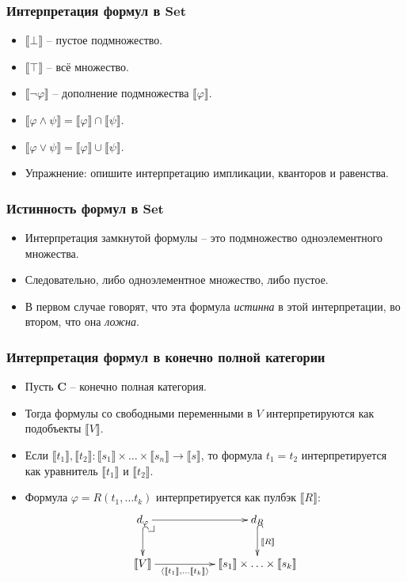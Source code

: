 \documentclass{beamer}
\makeatletter
\theoremstyle{definition}
\newcommand{\cat}[1]{\mathbf{#1}}
\renewcommand{\C}{\cat{C}}
\newcommand{\Set}{\cat{Set}}
\renewcommand{\ll}{\llbracket}
\newcommand{\rr}{\rrbracket}
\newcommand{\pb}[1][dr]{\save*!/#1-1.2pc/#1:(-1,1)@^{|-}\restore}
\makeatother
\begin{document}
\begin{frame}
\frametitle{Интерпретация формул в $\Set$}
\begin{itemize}
\item $\ll \bot \rr$ -- пустое подмножество.
\item $\ll \top \rr$ -- всё множество.
\item $\ll \neg \varphi \rr$ -- дополнение подмножества $\ll \varphi \rr$.
\item $\ll \varphi \land \psi \rr = \ll \varphi \rr \cap \ll \psi \rr$.
\item $\ll \varphi \lor \psi \rr = \ll \varphi \rr \cup \ll \psi \rr$.
\item Упражнение: опишите интерпретацию импликации, кванторов и равенства.
\end{itemize}
\end{frame}

\begin{frame}
\frametitle{Истинность формул в $\Set$}
\begin{itemize}
\item Интерпретация замкнутой формулы -- это подмножество одноэлементного множества.
\item Следовательно, либо одноэлементное множество, либо пустое.
\item В первом случае говорят, что эта формула \emph{истинна} в этой интерпретации, во втором, что она \emph{ложна}.
\end{itemize}
\end{frame}

\begin{frame}
\frametitle{Интерпретация формул в конечно полной категории}
\begin{itemize}
\item Пусть $\C$ -- конечно полная категория.
\item Тогда формулы со свободными переменными в $V$ интерпретируются как подобъекты $\ll V \rr$.
\item Если $\ll t_1 \rr, \ll t_2 \rr : \ll s_1 \rr \times \ldots \times \ll s_n \rr \to \ll s \rr$, то формула $t_1 = t_2$ интерпретируется как уравнитель $\ll t_1 \rr$ и $\ll t_2 \rr$.
\item Формула $\varphi = R(t_1, \ldots t_k)$ интерпретируется как пулбэк $\ll R \rr$:
\[ \xymatrix{ d_\varphi \pb \ar[rr] \ar@{^{(}->}[d]                                & & d_R \ar@{^{(}->}[d]^{\ll R \rr} \\
              \ll V \rr \ar[rr]_-{\langle \ll t_1 \rr, \ldots \ll t_k \rr \rangle} & & \ll s_1 \rr \times \ldots \times \ll s_k \rr
            } \]
\end{itemize}
\end{frame}
\end{document}
